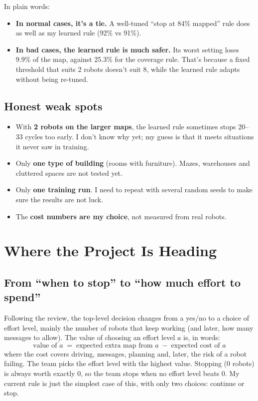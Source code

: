 \documentclass[11pt,a4paper]{article}
\begin{document}
In plain words:
\begin{itemize}
  \item \textbf{In normal cases, it's a tie.} A well-tuned ``stop at 84\% mapped'' rule does as well as my learned rule (92\% vs 91\%).
  \item \textbf{In bad cases, the learned rule is much safer.} Its worst setting loses 9.9\% of the map, against 25.3\% for the coverage rule. That's because a fixed threshold that suits 2 robots doesn't suit 8, while the learned rule adapts without being re-tuned.
\end{itemize}

\subsection{Honest weak spots}
\begin{itemize}
  \item With \textbf{2 robots on the larger maps}, the learned rule sometimes stops 20--33 cycles too early. I don't know why yet; my guess is that it meets situations it never saw in training.
  \item Only \textbf{one type of building} (rooms with furniture). Mazes, warehouses and cluttered spaces are not tested yet.
  \item Only \textbf{one training run}. I need to repeat with several random seeds to make sure the results are not luck.
  \item The \textbf{cost numbers are my choice}, not measured from real robots.
\end{itemize}

\section{Where the Project Is Heading}

\subsection{From ``when to stop'' to ``how much effort to spend''}

Following the review, the top-level decision changes from a yes/no to a choice of effort level, mainly the number of robots that keep working (and later, how many messages to allow). The value of choosing an effort level $a$ is, in words:
\[
\text{value of } a \;=\; \text{expected extra map from } a \;-\; \text{expected cost of } a
\]
where the cost covers driving, messages, planning and, later, the risk of a robot failing.
The team picks the effort level with the highest value. Stopping (0 robots) is always worth exactly 0, so the team stops when no effort level beats 0. My current rule is just the simplest case of this, with only two choices: continue or stop.
\end{document}
